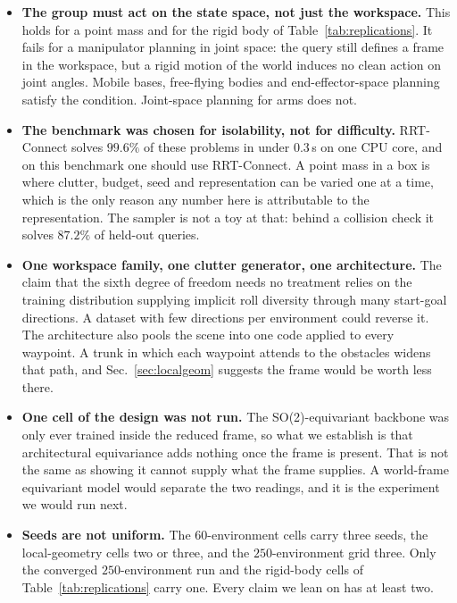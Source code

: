 \documentclass[conference]{IEEEtran}
\begin{document}
\begin{itemize}\itemsep3pt
  \item \textbf{The group must act on the state space, not just the workspace.}
  This holds for a point mass and for the rigid body of Table~\ref{tab:replications}.
  It fails for a manipulator planning in joint space: the query still defines a
  frame in the workspace, but a rigid motion of the world induces no clean action
  on joint angles. Mobile bases, free-flying bodies and end-effector-space
  planning satisfy the condition. Joint-space planning for arms does not.

  \item \textbf{The benchmark was chosen for isolability, not for difficulty.}
  RRT-Connect solves $99.6\%$ of these problems in under $0.3$\,s on one CPU
  core, and on this benchmark one should use RRT-Connect. A point mass in a box
  is where clutter, budget, seed and representation can be varied one at a time,
  which is the only reason any number here is attributable to the representation.
  The sampler is not a toy at that: behind a collision check it solves $87.2\%$
  of held-out queries.

  \item \textbf{One workspace family, one clutter generator, one architecture.}
  The claim that the sixth degree of freedom needs no treatment relies on the
  training distribution supplying implicit roll diversity through many start-goal
  directions. A dataset with few directions per environment could reverse it. The
  architecture also pools the scene into one code applied to every waypoint. A
  trunk in which each waypoint attends to the obstacles widens that path, and
  Sec.~\ref{sec:localgeom} suggests the frame would be worth less there.

  \item \textbf{One cell of the design was not run.} The SO(2)-equivariant backbone
  was only ever trained inside the reduced frame, so what we establish is that
  architectural equivariance adds nothing once the frame is present. That is not
  the same as showing it cannot supply what the frame supplies. A world-frame
  equivariant model would separate the two readings, and it is the experiment we
  would run next.

  \item \textbf{Seeds are not uniform.} The $60$-environment cells carry three
  seeds, the local-geometry cells two or three, and the $250$-environment grid
  three. Only the converged $250$-environment run and the rigid-body cells of
  Table~\ref{tab:replications} carry one. Every claim we lean on has at least two.


\end{itemize}
\end{document}
